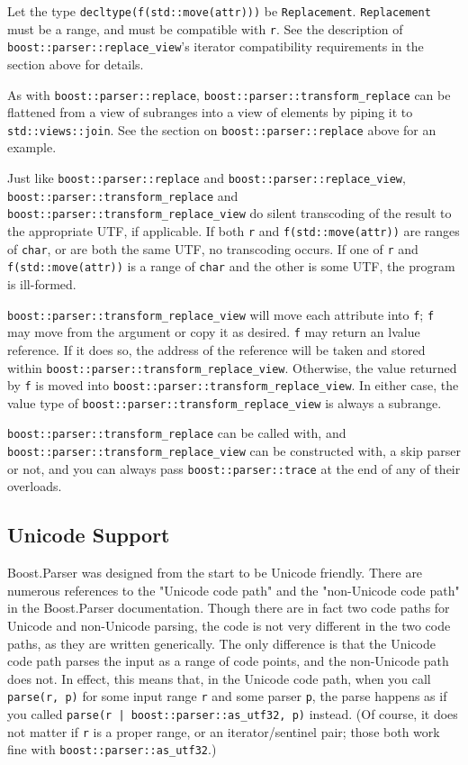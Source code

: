 Let the type \texttt{decltype(f(std::move(attr)))} be \texttt{Replacement}. \texttt{Replacement} must be a range, and must be compatible with \texttt{r}. See the description of \texttt{boost::parser::replace\_view}'s iterator compatibility requirements in the section above for details.

As with \texttt{boost::parser::replace}, \texttt{boost::parser::transform\_replace} can be flattened from a view of subranges into a view of elements by piping it to \texttt{std::views::join}. See the section on \texttt{boost::parser::replace} above for an example.

Just like \texttt{boost::parser::replace} and \texttt{boost::parser::replace\_view}, \texttt{boost::parser::transform\_replace} and \texttt{boost::parser::transform\_replace\_view} do silent transcoding of the result to the appropriate UTF, if applicable. If both \texttt{r} and \texttt{f(std::move(attr))} are ranges of \texttt{char}, or are both the same UTF, no transcoding occurs. If one of \texttt{r} and \texttt{f(std::move(attr))} is a range of \texttt{char} and the other is some UTF, the program is ill-formed.

\texttt{boost::parser::transform\_replace\_view} will move each attribute into \texttt{f}; \texttt{f} may move from the argument or copy it as desired. \texttt{f} may return an lvalue reference. If it does so, the address of the reference will be taken and stored within \texttt{boost::parser::transform\_replace\_view}. Otherwise, the value returned by \texttt{f} is moved into \texttt{boost::parser::transform\_replace\_view}. In either case, the value type of \texttt{boost::parser::transform\_replace\_view} is always a subrange.

\texttt{boost::parser::transform\_replace} can be called with, and \texttt{boost::parser::transform\_replace\_view} can be constructed with, a skip parser or not, and you can always pass \texttt{boost::parser::trace} at the end of any of their overloads.

\subsection{Unicode Support}

Boost.Parser was designed from the start to be Unicode friendly. There are numerous references to the "Unicode code path" and the "non-Unicode code path" in the Boost.Parser documentation. Though there are in fact two code paths for Unicode and non-Unicode parsing, the code is not very different in the two code paths, as they are written generically. The only difference is that the Unicode code path parses the input as a range of code points, and the non-Unicode path does not. In effect, this means that, in the Unicode code path, when you call \texttt{parse(r, p)} for some input range \texttt{r} and some parser \texttt{p}, the parse happens as if you called \texttt{parse(r | boost::parser::as\_utf32, p)} instead. (Of course, it does not matter if \texttt{r} is a proper range, or an iterator/sentinel pair; those both work fine with \texttt{boost::parser::as\_utf32}.)

